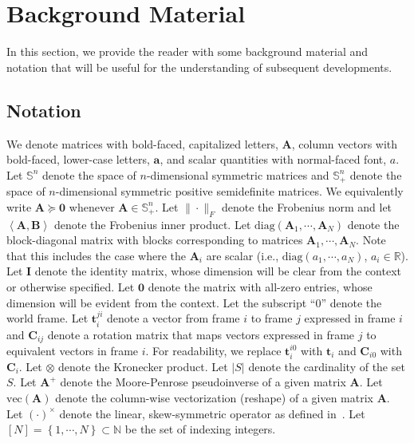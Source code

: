 \documentclass[lettersize,journal]{IEEEtran}
\newcommand{\vect}[1]{\mbox{vec}(#1)}
\newcommand{\diag}[1]{\mbox{diag}\left(#1\right)}
\begin{document}
\section{Background Material}\label{sec:Background}

In this section, we provide the reader with some background material and notation that will be useful for the understanding of subsequent developments.

\subsection{Notation}\label{sec:Notn}
We denote matrices with bold-faced, capitalized letters, $ \bm{A} $, column vectors with bold-faced, lower-case letters, $ \bm{a} $, and scalar quantities with normal-faced font, $ a $.
Let $ \mathbb{S}^n $ denote the space of $ n $-dimensional symmetric matrices and $ \mathbb{S}_+^n $ denote the space of $ n $-dimensional symmetric positive semidefinite matrices. We equivalently write $\bm{A}\succeq\bm{0}$ whenever $\bm{A}\in\mathbb{S}_+^n$. 
Let $ \|\cdot\|_F $ denote the Frobenius norm and let $\left<\bm{A},\bm{B}\right>$ denote the Frobenius inner product. 
Let $ \diag{\bm{A}_1,\cdots,\bm{A}_N} $ denote the block-diagonal matrix with blocks corresponding to matrices $ \bm{A}_1,\cdots,\bm{A}_N $. Note that this includes the case where the $ \bm{A}_i $ are scalar (i.e., $\diag{a_1,\cdots,a_N}$, $a_i \in \mathbb{R}$).
Let $ \bm{I} $ denote the identity matrix, whose dimension will be clear from the context or otherwise specified.
Let $ \bm{0} $ denote the matrix with all-zero entries, whose dimension will be evident from the context.
Let the subscript ``$ 0 $'' denote the world frame.
Let $ \bm{t}_i^{ji} $ denote a vector from frame $ i $ to frame $ j $ expressed in frame $ i $ and $ \bm{C}_{ij} $ denote a rotation matrix that maps vectors expressed in frame $ j $ to equivalent vectors in frame $ i $. For readability, we replace $ \bm{t}_i^{i0} $ with $ \bm{t}_i $ and $\bm{C}_{i0}$ with $\bm{C}_i$. 
Let $ \otimes $ denote the Kronecker product.
Let $ \vert S \vert $ denote the cardinality of the set $ S $.
Let $ \bm{A}^+ $ denote the Moore-Penrose pseudoinverse of a given matrix $ \bm{A} $.
Let $ \vect{\bm{A}} $ denote the column-wise  vectorization (reshape) of a given matrix $ \bm{A} $.
Let $ (\cdot)^{\times} $ denote the linear, skew-symmetric operator as defined in~\cite{barfootStateEstimationRobotics2017}.
Let $\left[N\right] = \left\{1,\cdots, N\right\} \subset \mathbb{N}$ be the set of indexing integers.
\end{document}
